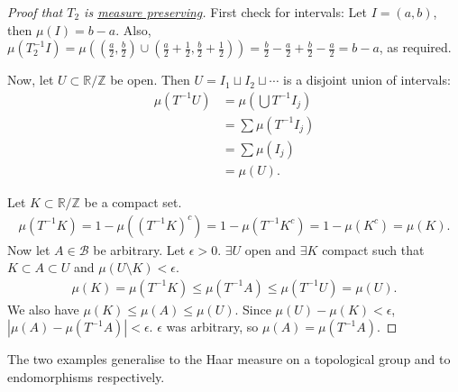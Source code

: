 \documentclass{article}
\begin{document}
\begin{proof}[Proof that \hyperlink{def:doubling}{$T_2$} is \hyperlink{def:mps}{measure preserving}]
  First check for intervals: Let $I = (a,b)$, then $\mu(I) = b-a$.
  Also, $\mu(T_2^{-1}I) = \mu\left((\frac{a}{2},\frac{b}{2}) \cup (\frac{a}{2} + \frac{1}{2}, \frac{b}{2} + \frac{1}{2})\right) = \frac{b}{2} - \frac{a}{2} + \frac{b}{2} - \frac{a}{2} = b - a$, as required.

  Now, let $U \subset \mathbb{R}/\mathbb{Z}$ be open. Then $U = I_1 \sqcup I_2 \sqcup \dotsb$ is a disjoint union of intervals:
  \begin{align*}
    \mu(T^{-1} U) &= \mu\left(\bigcup T^{-1} I_j\right) \\
                  &= \sum \mu(T^{-1} I_j) \\
                  &= \sum \mu(I_j) \\
                  &= \mu(U).
  \end{align*}

  Let $K \subset \mathbb{R}/\mathbb{Z}$ be a compact set.
  \begin{align*}
    \mu(T^{-1} K) = 1 - \mu((T^{-1} K)^c) = 1 - \mu(T^{-1} K^c) = 1 - \mu(K^c) = \mu(K).
  \end{align*}
  Now let $A \in \mathcal{B}$ be arbitrary. Let $\epsilon > 0$. $\exists U$ open and $\exists K$ compact such that $K \subset A \subset U$ and $\mu(U \setminus K) < \epsilon$.
  \begin{align*}
    \mu(K) = \mu(T^{-1} K) \leq \mu(T^{-1} A) \leq \mu(T^{-1} U) = \mu(U).
  \end{align*}
  We also have $\mu(K) \leq \mu(A) \leq \mu(U)$.
  Since $\mu(U) - \mu(K) < \epsilon$, $|\mu(A) - \mu(T^{-1}A)| < \epsilon$. $\epsilon$ was arbitrary, so $\mu(A) = \mu(T^{-1} A)$.
\end{proof}

The two examples generalise to the Haar measure on a topological group and to endomorphisms respectively.
\end{document}

